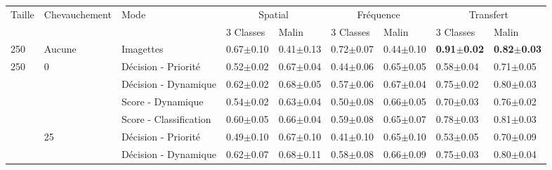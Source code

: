 \begin{landscape}
\begin{table}[]
    \centering
    \begin{tabular}{lllllllll}
		\toprule
		\multirow{2}{*}{Taille}     & \multirow{2}{*}{Chevauchement}    & \multirow{2}{*}{Mode}     & \multicolumn{2}{c}{Spatial}       & \multicolumn{2}{c}{Fréquence}     & \multicolumn{2}{c}{Transfert}         \\
		                            &                                   &                           & 3 Classes         & Malin         & 3 Classes         & Malin         & 3 Classes         & Malin             \\ \midrule
		250                         & Aucune                            & Imagettes                 & 0.67$\pm$0.10         & 0.41$\pm$0.13     & 0.72$\pm$0.07         & 0.44$\pm$0.10     & \textbf{0.91$\pm$0.02}& \textbf{0.82$\pm$0.03}\\ \midrule
		\multirow{12}{*}{250}       & \multirow{4}{*}{0}                & Décision - Priorité                    & 0.52$\pm$0.02         & 0.67$\pm$0.04     & 0.44$\pm$0.06         & 0.65$\pm$0.05     & 0.58$\pm$0.04         & 0.71$\pm$0.05         \\ 
							        &                                   & Décision - Dynamique                    & 0.62$\pm$0.02         & 0.68$\pm$0.05     & 0.57$\pm$0.06         & 0.67$\pm$0.04     & 0.75$\pm$0.02         & 0.80$\pm$0.03         \\
							        &                                   & Score - Dynamique               & 0.54$\pm$0.02         & 0.63$\pm$0.04     & 0.50$\pm$0.08         & 0.66$\pm$0.05     & 0.70$\pm$0.03         & 0.76$\pm$0.02         \\
							        &                                   & Score - Classification                    & 0.60$\pm$0.05         & 0.66$\pm$0.04     & 0.59$\pm$0.08         & 0.65$\pm$0.07     & 0.78$\pm$0.03         & 0.81$\pm$0.03         \\ \cline{2-9}
							        & \multirow{4}{*}{25}               & Décision - Priorité                    & 0.49$\pm$0.10         & 0.67$\pm$0.10     & 0.41$\pm$0.10         & 0.65$\pm$0.10     & 0.53$\pm$0.05         & 0.70$\pm$0.09         \\
							        &                                   & Décision - Dynamique                    & 0.62$\pm$0.07         & 0.68$\pm$0.11     & 0.58$\pm$0.08         & 0.66$\pm$0.09     & 0.75$\pm$0.03         & 0.80$\pm$0.04         \\

\end{tabular}
\end{table}
\end{landscape}
